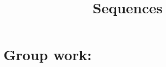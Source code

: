 \documentclass[]{ximera}
\title{Sequences}
\begin{document}
\begin{abstract}		\end{abstract}
\maketitle



\begin{comment}
\section{Warm up:}

	\begin{freeResponse}
	
	\end{freeResponse}
	
\begin{instructorNotes}

\end{instructorNotes}
\end{comment}







\section{Group work:}
\end{document}
